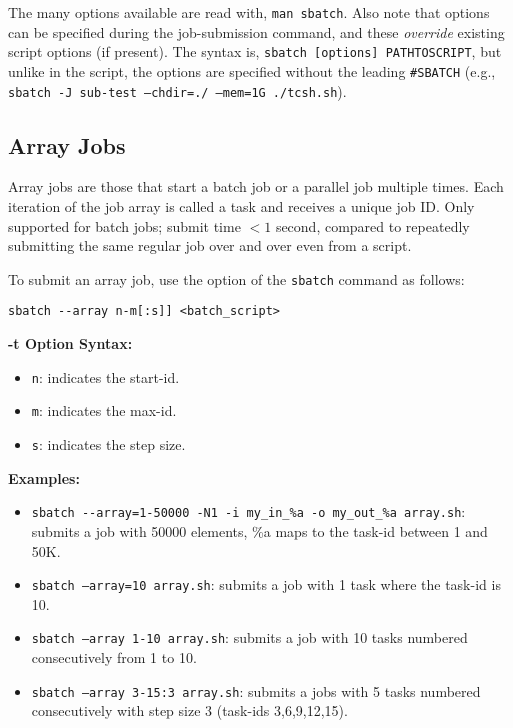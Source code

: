 The many  options available are read with, \texttt{man sbatch}. Also 
note that  options can be specified during the job-submission 
command, and these \emph{override} existing script options (if present). The 
syntax is, \texttt{sbatch [options] PATHTOSCRIPT}, but unlike in the script, 
the options are specified without the leading \verb+#SBATCH+
(e.g., \texttt{sbatch -J sub-test --chdir=./ --mem=1G ./tcsh.sh}).


\subsection{Array Jobs}
\label{sect:array-jobs}

Array jobs are those that start a batch job or a parallel job multiple times. 
Each iteration of the job array is called a task and receives a unique job ID.
Only supported for batch jobs; submit time $< 1$ second, compared to repeatedly
submitting the same regular job over and over even from a script.

To submit an array job, use the  option of the \texttt{sbatch} 
command as follows:

\begin{verbatim}
sbatch --array n-m[:s]] <batch_script>
\end{verbatim}

\textbf{-t Option Syntax:}
\begin{itemize}
\item
\texttt{n}: indicates the start-id.
\item
\texttt{m}: indicates the max-id.
\item
\texttt{s}: indicates the step size.
\end{itemize}

\textbf{Examples:}
\begin{itemize}
\item
\verb+sbatch --array=1-50000 -N1 -i my_in_%a -o my_out_%a array.sh+: submits a job with 50000 elements,
\%a maps to the task-id between 1 and 50K. 
\item
\texttt{sbatch --array=10 array.sh}: submits a job with 1 task where the task-id is 10. 
\item
\texttt{sbatch --array 1-10 array.sh}: submits a job with 10 tasks numbered consecutively from 1 to 10.
\item
\texttt{sbatch --array 3-15:3 array.sh}: submits a jobs with 5 tasks numbered consecutively with step size 3
(task-ids 3,6,9,12,15).
\end{itemize}

